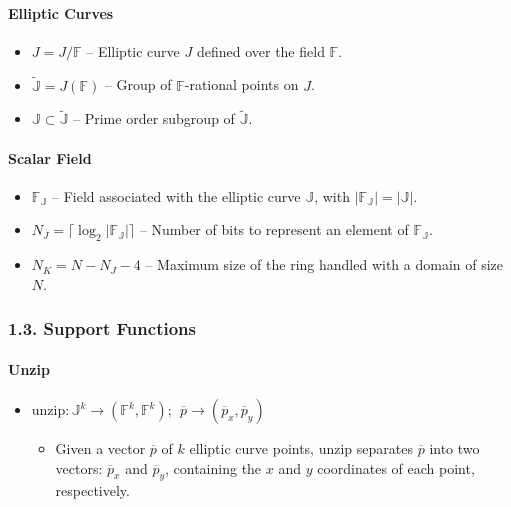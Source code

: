 \documentclass[
]{article}
\providecommand{\tightlist}{%
  \setlength{\itemsep}{0pt}\setlength{\parskip}{0pt}}
\begin{document}
\hypertarget{elliptic-curves}{%
\paragraph{Elliptic Curves}\label{elliptic-curves}}

\begin{itemize}
\tightlist
\item
  \(J = J / \mathbb{F}\) -- Elliptic curve \(J\) defined over the field
  \(\mathbb{F}\).
\item
  \(\tilde{\mathbb{J}} = J(\mathbb{F})\) -- Group of
  \(\mathbb{F}\)-rational points on \(J\).
\item
  \(\mathbb{J} \subset \tilde{\mathbb{J}}\) -- Prime order subgroup of
  \(\tilde{\mathbb{J}}\).
\end{itemize}

\hypertarget{scalar-field}{%
\paragraph{Scalar Field}\label{scalar-field}}

\begin{itemize}
\tightlist
\item
  \(\mathbb{F_J}\) -- Field associated with the elliptic curve
  \(\mathbb{J}\), with \(|\mathbb{F_J}| = |\mathbb{J}|\).
\item
  \(N_J = \lceil \log_2 |\mathbb{F_J}| \rceil\) -- Number of bits to
  represent an element of \(\mathbb{F_J}\).
\item
  \(N_K = N - N_J - 4\) -- Maximum size of the ring handled with a
  domain of size \(N\).
\end{itemize}

\hypertarget{support-functions}{%
\subsubsection{1.3. Support Functions}\label{support-functions}}

\hypertarget{unzip}{%
\paragraph{Unzip}\label{unzip}}

\begin{itemize}
\tightlist
\item
  \(\text{unzip}: \mathbb{J}^k \rightarrow (\mathbb{F}^k, \mathbb{F}^k);\ \ \overline{p} \rightarrow (\overline{p}_x, \overline{p}_y)\)

  \begin{itemize}
  \tightlist
  \item
    Given a vector \(\overline{p}\) of \(k\) elliptic curve points,
    \(\text{unzip}\) separates \(\overline{p}\) into two vectors:
    \(\overline{p}_x\) and \(\overline{p}_y\), containing the \(x\) and
    \(y\) coordinates of each point, respectively.
  \end{itemize}
\end{itemize}
\end{document}
